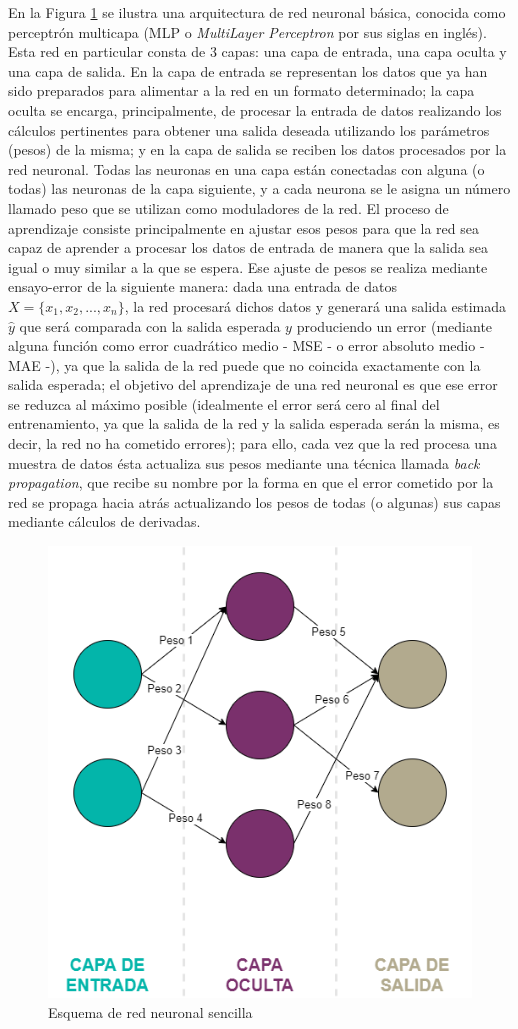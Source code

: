 En la Figura \ref{fig:simplenet} se ilustra una arquitectura de red neuronal básica, conocida como perceptrón multicapa (MLP o \textit{MultiLayer Perceptron} por sus siglas en inglés). Esta red en particular consta de 3 capas: una capa de entrada, una capa oculta y una capa de salida. En la capa de entrada se representan los datos que ya han sido preparados para alimentar a la red en un formato determinado; la capa oculta se encarga, principalmente, de procesar la entrada de datos realizando los cálculos pertinentes para obtener una salida deseada utilizando los parámetros (pesos) de la misma; y en la capa de salida se reciben los datos procesados por la red neuronal. Todas las neuronas en una capa están conectadas con alguna (o todas) las neuronas de la capa siguiente, y a cada neurona se le asigna un número llamado peso que se utilizan como moduladores de la red. El proceso de aprendizaje consiste principalmente en ajustar esos pesos para que la red sea capaz de aprender a procesar los datos de entrada de manera que la salida sea igual o muy similar a la que se espera. Ese ajuste de pesos se realiza mediante ensayo-error de la siguiente manera: dada una entrada de datos $X=\{x_1,x_2,...,x_n\}$, la red procesará dichos datos y generará una salida estimada $\hat y$ que será comparada con la salida esperada $y$ produciendo un error (mediante alguna función como error cuadrático medio - MSE - o error absoluto medio - MAE -), ya que la salida de la red puede que no coincida exactamente con la salida esperada; el objetivo del aprendizaje de una red neuronal es que ese error se reduzca al máximo posible (idealmente el error será cero al final del entrenamiento, ya que la salida de la red y la salida esperada serán la misma, es decir, la red no ha cometido errores); para ello, cada vez que la red procesa una muestra de datos ésta actualiza sus pesos mediante una técnica llamada \textit{back propagation}, que recibe su nombre por la forma en que el error cometido por la red se propaga hacia atrás actualizando los pesos de todas (o algunas) sus capas mediante cálculos de derivadas. 

\begin{figure}
  \centering
  \includegraphics[width=.6\linewidth]{img/simplenet}
  \caption{Esquema de red neuronal sencilla}
  \label{fig:simplenet}
\end{figure}

